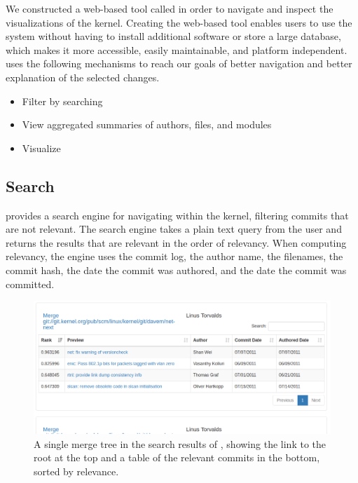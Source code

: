 
We constructed a web-based tool called \tool in order to navigate and
inspect the \mt visualizations of the kernel. Creating the web-based
tool enables users to use the system without having to install
additional software or store a large database, which makes it more
accessible, easily maintainable, and platform independent. \tool uses
the following mechanisms to reach our goals of better navigation and
better explanation of the selected changes.

\begin{itemize}
        \item Filter by searching
        \item View aggregated summaries of authors, files, and modules
        \item Visualize 
\end{itemize}

\subsection{Search}

\tool provides a search engine for navigating within the kernel,
filtering commits that are not relevant. The search engine takes a
plain text query from the user and returns the results that are relevant
in the order of relevancy. When computing relevancy, the engine uses the
commit log, the author name, the filenames, the commit hash, the date
the commit was authored, and the date the commit was committed.

\begin{figure}[htpb]
  \centering
  \includegraphics[width=\linewidth]{figures/linvis/search_results.png}
  \caption{A single merge tree in the search results of \tool, showing
    the link to the root at the top and a table of the relevant commits
    in the bottom, sorted by relevance.}
  \label{fig:search_results}
\end{figure}

